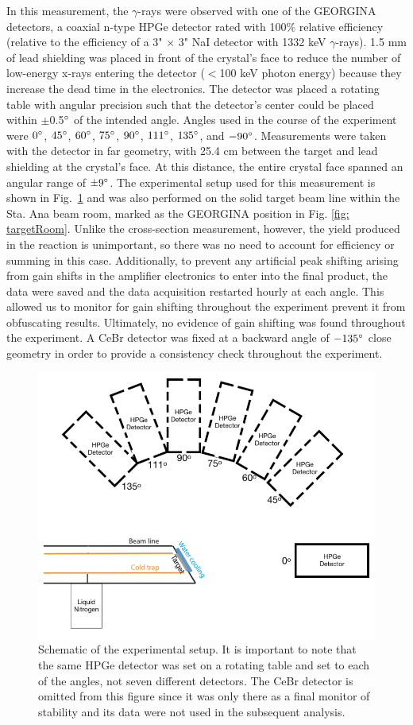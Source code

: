 In this measurement, the $\gamma$-rays were observed with one of the GEORGINA detectors, a coaxial n-type HPGe detector rated with 100\% relative efficiency (relative to the efficiency of a 3" $\times$ 3" NaI detector with 1332 keV $\gamma$-rays). 1.5 mm of lead shielding was placed in front of the crystal's face to reduce the number of low-energy x-rays entering the detector ($<$100 keV photon energy) because they increase the dead time in the electronics. The detector was placed a rotating table with angular precision such that the detector's center could be placed within $\pm$0.5$\degree$ of the intended angle. Angles used in the course of the experiment were $0\degree$, $45\degree$, $60\degree$, $75\degree$, $90\degree$, $111\degree$, $135\degree$, and $-90\degree$. Measurements were taken with the detector in far geometry, with 25.4 cm between the target and lead shielding at the crystal's face. At this distance, the entire crystal face spanned an angular range of $\pm9\degree$. The experimental setup used for this measurement is shown in Fig.\ \ref{fig: lifetimeSetup} and was also performed on the solid target beam line within the Sta. Ana beam room, marked as the GEORGINA position in Fig. \ref{fig: targetRoom}. Unlike the cross-section measurement, however, the yield produced in the reaction is unimportant, so there was no need to account for efficiency or summing in this case. Additionally, to prevent any artificial peak shifting arising from gain shifts in the amplifier electronics to enter into the final product, the data were saved and the data acquisition restarted hourly at each angle. This allowed us to monitor for gain shifting throughout the experiment prevent it from obfuscating results. Ultimately, no evidence of gain shifting was found throughout the experiment. A CeBr detector was fixed at a backward angle of $-135\degree$ close geometry in order to provide a consistency check throughout the experiment.


\begin{figure}
\centering
\includegraphics[width=0.8\linewidth]{figures/expSetup_lifetime.png}
\caption{Schematic of the experimental setup. It is important to note that the same HPGe detector was set on a rotating table and set to each of the angles, not seven different detectors. The CeBr detector is omitted from this figure since it was only there as a final monitor of stability and its data were not used in the subsequent analysis.}
\label{fig: lifetimeSetup}
\end{figure}

